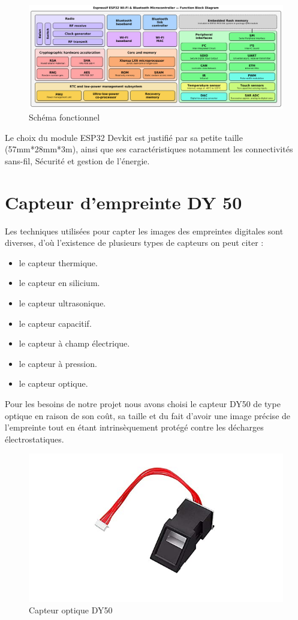     
    \begin{figure}[h!]
                 \centering
                    \includegraphics[scale=0.26 ]{images/esp32_fun.png}
                 \caption{Schéma fonctionnel}
                 \label{fig50}
    \end{figure}
   Le choix du module ESP32 Devkit est justifié par sa petite taille (57mm*28mm*3m), ainsi que ses caractéristiques notamment les connectivités sans-fil, Sécurité et gestion de l’énergie.

        
\section{Capteur d'empreinte DY 50}
Les techniques utilisées pour capter les images des empreintes digitales sont diverses, d’où l’existence de plusieurs types de capteurs on peut citer :
    \begin{itemize}
        \item le capteur thermique.
        \item le capteur en silicium.
        \item le capteur ultrasonique.
        \item le capteur capacitif.
        \item le capteur à champ électrique.
        \item le capteur à pression.
        \item le capteur optique.
    \end{itemize}
    Pour les besoins de notre projet nous avons choisi le capteur DY50 de type optique en raison de son coût, sa taille et du fait d’avoir une image précise de l’empreinte tout en étant intrinsèquement protégé contre les décharges électrostatiques.
    \begin{figure}[h!]
                 \centering
                    \includegraphics[scale=0.8]{images/dy50.jpg}
                 \caption{Capteur optique DY50}
                 \label{fig51}
    \end{figure}
